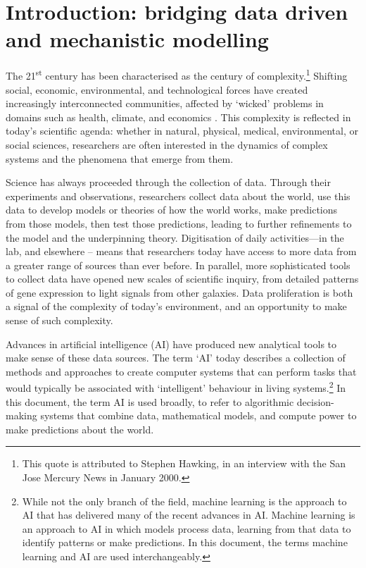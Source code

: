 \section{Introduction: bridging data driven and mechanistic
modelling}\label{introduction-bridging-data-driven-and-mechanistic-modelling}

The 21\textsuperscript{st} century has been characterised as the century
of complexity.\footnote{This quote is attributed to Stephen Hawking, in
  an interview with the San Jose Mercury News in January 2000.} Shifting
social, economic, environmental, and technological forces have created
increasingly interconnected communities, affected by `wicked' problems
in domains such as health, climate, and economics \cite{Rittel-dilemmas73}. This complexity is reflected in today's scientific
agenda: whether in natural, physical, medical, environmental, or social
sciences, researchers are often interested in the dynamics of complex
systems and the phenomena that emerge from them.

Science has always proceeded through the collection of data. Through
their experiments and observations, researchers collect data about the
world, use this data to develop models or theories of how the world
works, make predictions from those models, then test those predictions,
leading to further refinements to the model and the underpinning theory.
Digitisation of daily activities---in the lab, and elsewhere -- means
that researchers today have access to more data from a greater range of
sources than ever before. In parallel, more sophisticated tools to
collect data have opened new scales of scientific inquiry, from detailed
patterns of gene expression to light signals from other galaxies. Data
proliferation is both a signal of the complexity of today's environment,
and an opportunity to make sense of such complexity.

Advances in artificial intelligence (AI) have produced new analytical
tools to make sense of these data sources. The term `AI' today describes
a collection of methods and approaches to create computer systems that
can perform tasks that would typically be associated with `intelligent'
behaviour in living systems.\footnote{While not the only branch of the
  field, machine learning is the approach to AI that has delivered many
  of the recent advances in AI. Machine learning is an approach to AI in
  which models process data, learning from that data to identify
  patterns or make predictions. In this document, the terms machine
  learning and AI are used interchangeably.} In this document, the term
AI is used broadly, to refer to algorithmic decision-making systems that
combine data, mathematical models, and compute power to make predictions
about the world.

